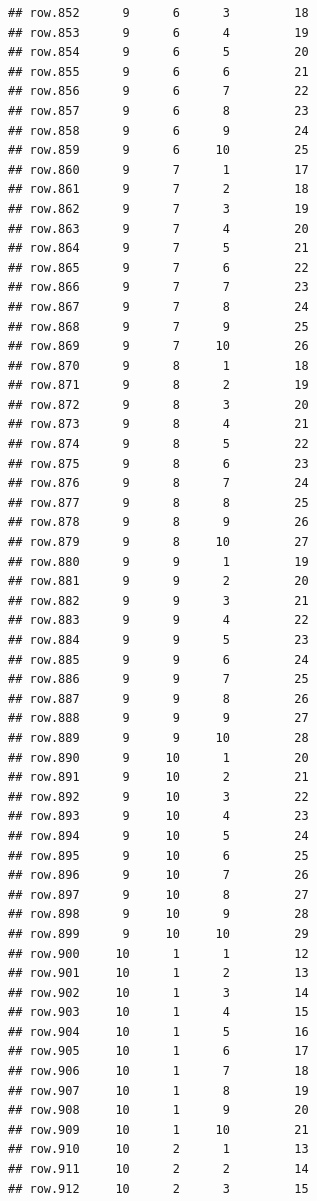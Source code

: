 \documentclass[
]{article}
\begin{document}
\begin{verbatim}
## row.852      9      6      3         18
## row.853      9      6      4         19
## row.854      9      6      5         20
## row.855      9      6      6         21
## row.856      9      6      7         22
## row.857      9      6      8         23
## row.858      9      6      9         24
## row.859      9      6     10         25
## row.860      9      7      1         17
## row.861      9      7      2         18
## row.862      9      7      3         19
## row.863      9      7      4         20
## row.864      9      7      5         21
## row.865      9      7      6         22
## row.866      9      7      7         23
## row.867      9      7      8         24
## row.868      9      7      9         25
## row.869      9      7     10         26
## row.870      9      8      1         18
## row.871      9      8      2         19
## row.872      9      8      3         20
## row.873      9      8      4         21
## row.874      9      8      5         22
## row.875      9      8      6         23
## row.876      9      8      7         24
## row.877      9      8      8         25
## row.878      9      8      9         26
## row.879      9      8     10         27
## row.880      9      9      1         19
## row.881      9      9      2         20
## row.882      9      9      3         21
## row.883      9      9      4         22
## row.884      9      9      5         23
## row.885      9      9      6         24
## row.886      9      9      7         25
## row.887      9      9      8         26
## row.888      9      9      9         27
## row.889      9      9     10         28
## row.890      9     10      1         20
## row.891      9     10      2         21
## row.892      9     10      3         22
## row.893      9     10      4         23
## row.894      9     10      5         24
## row.895      9     10      6         25
## row.896      9     10      7         26
## row.897      9     10      8         27
## row.898      9     10      9         28
## row.899      9     10     10         29
## row.900     10      1      1         12
## row.901     10      1      2         13
## row.902     10      1      3         14
## row.903     10      1      4         15
## row.904     10      1      5         16
## row.905     10      1      6         17
## row.906     10      1      7         18
## row.907     10      1      8         19
## row.908     10      1      9         20
## row.909     10      1     10         21
## row.910     10      2      1         13
## row.911     10      2      2         14
## row.912     10      2      3         15

\end{verbatim}
\end{document}
